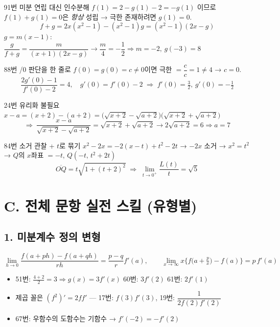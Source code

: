 \documentclass[11pt,a4paper]{article}
\begin{document}
\begin{prob}{91번 \quad 미분 연립 대신 인수분해}
$f(1)=2-g(1)-2=-g(1)$ 이므로 $f(1)+g(1)=0$은 \emph{항상} 성립 → 극한 존재하려면 $g(1)=0$.
\[
f+g=2x(x^2-1)-(x^2-1)g=(x^2-1)(2x-g)
\]
$g=m(x-1)$: \;$\dfrac{g}{f+g}=\dfrac{m}{(x+1)(2x-g)}\to\dfrac{m}{4}=-\dfrac12 \Rightarrow m=-2,\ g(-3)=8$
\end{prob}

\begin{prob}{88번 /0 판단을 한 줄로}
$f(0)=g(0)=c\neq0$이면 극한 $=\dfrac{c}{c}=1\neq4$ → $c=0$.
\[
\frac{2g'(0)-1}{f'(0)-2}=4,\quad g'(0)=f'(0)-2 \;\Rightarrow\; f'(0)=\tfrac32,\ g'(0)=-\tfrac12
\]
\end{prob}

\begin{prob}{24번 \quad 유리화 불필요}
$x-a=(x+2)-(a+2)=\big(\sqrt{x+2}-\sqrt{a+2}\big)\big(\sqrt{x+2}+\sqrt{a+2}\big)$
\[
\Rightarrow\ \frac{x-a}{\sqrt{x+2}-\sqrt{a+2}}=\sqrt{x+2}+\sqrt{a+2}\to2\sqrt{a+2}=6\Rightarrow a=7
\]
\end{prob}

\begin{prob}{84번 \quad 소거 관찰 + $t$로 묶기}
$x^2-2x=-2(x-t)+t^2-2t$ → $-2x$ 소거 → $x^2=t^2$ → $Q$의 $x$좌표 $=-t$, \;$Q(-t,\,t^2+2t)$
\[
\overline{OQ}=t\sqrt{1+(t+2)^2}\;\Rightarrow\;\lim_{t\to0^+}\frac{L(t)}{t}=\sqrt5
\]
\end{prob}

\section{C. 전체 문항 실전 스킬 (유형별)}

\subsection{1. 미분계수 정의 변형 }
\[
\lim_{h\to0}\frac{f(a+ph)-f(a+qh)}{rh}=\frac{p-q}{r}f'(a),\qquad
\lim_{x\to\infty}x\Big\{f\big(a+\tfrac px\big)-f(a)\Big\}=p\,f'(a)
\]
\begin{itemize}
\item 51번: $\frac{4+2}{2}=3 \Rightarrow g(x)=3f'(x)$ \quad 60번: $3f'(2)$ \quad 61번: $2f'(1)$
\item 제곱 꼴은 $(f^2)'=2ff'$ — 17번: $f(3)f'(3)$, \;19번: $\dfrac{1}{2f(2)f'(2)}$
\item 67번: 우함수의 도함수는 기함수 → $f'(-2)=-f'(2)$
\end{itemize}
\end{document}
